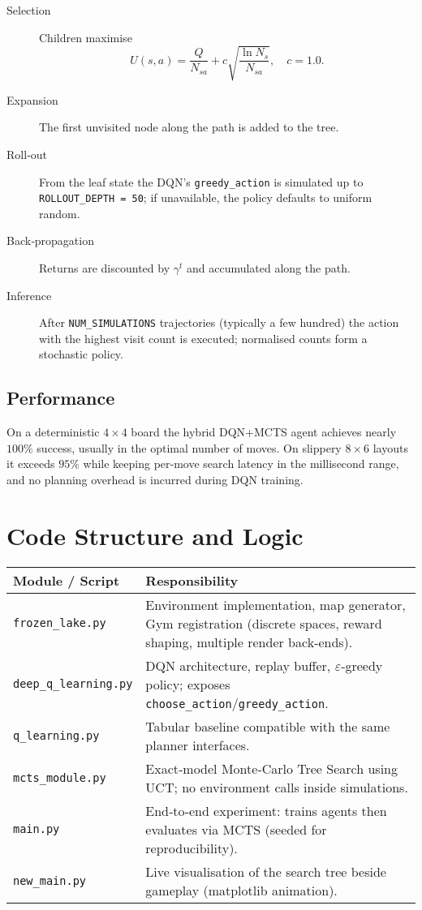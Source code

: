 \documentclass{report}
\begin{document}
\begin{description}
  \item[Selection] Children maximise
  \[
  U(s,a)=\frac{Q}{N_{sa}} + c\sqrt{\frac{\ln N_s}{N_{sa}}}, \quad c=1.0.
  \]
  \item[Expansion] The first unvisited node along the path is added to the tree.
  \item[Roll‑out] From the leaf state the DQN’s \texttt{greedy\_action} is simulated up to \texttt{ROLLOUT\_DEPTH = 50}; if unavailable, the policy defaults to uniform random.
  \item[Back‑propagation] Returns are discounted by $\gamma^{t}$ and accumulated along the path.
  \item[Inference] After \texttt{NUM\_SIMULATIONS} trajectories (typically a few hundred) the action with the highest visit count is executed; normalised counts form a stochastic policy.
\end{description}
 
\subsection{Performance}
On a deterministic $4\times4$ board the hybrid DQN+MCTS agent achieves nearly $100\%$ success, usually in the optimal number of moves. On slippery $8\times6$ layouts it exceeds $95\%$ while keeping per‑move search latency in the millisecond range, and no planning overhead is incurred during DQN training.
 
\section{Code Structure and Logic}
\begin{center}
\begin{tabular}{@{}p{4cm}p{8.5cm}@{}}
  \toprule
  \textbf{Module / Script} & \textbf{Responsibility} \\
  \midrule
  \texttt{frozen\_lake.py}   & Environment implementation, map generator, Gym registration (discrete spaces, reward shaping, multiple render back‑ends). \\
  \texttt{deep\_q\_learning.py} & DQN architecture, replay buffer, $\varepsilon$‑greedy policy; exposes \texttt{choose\_action}/\texttt{greedy\_action}. \\
  \texttt{q\_learning.py}     & Tabular baseline compatible with the same planner interfaces. \\
  \texttt{mcts\_module.py}    & Exact‑model Monte‑Carlo Tree Search using UCT; no environment calls inside simulations. \\
  \texttt{main.py}            & End‑to‑end experiment: trains agents then evaluates via MCTS (seeded for reproducibility). \\
  \texttt{new\_main.py}       & Live visualisation of the search tree beside gameplay (matplotlib animation). \\
  \bottomrule
\end{tabular}
\end{center}
 
\end{document}
